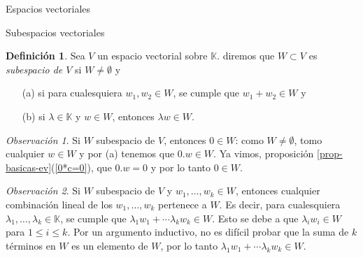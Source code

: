 \documentclass[a4paper,12pt,twoside,spanish]{amsbook}
\theoremstyle{definition}
\newtheorem{definicion}{Definici\'on}[section]
\theoremstyle{remark}
\newtheorem{observacion}{Observaci\'on}[section]
\newcommand{\K}{\mathbb K}
\begin{document}
\begin{chapter}{Espacios vectoriales}
\begin{section}{Subespacios vectoriales}
	\begin{definicion}
		Sea $V$ un espacio vectorial sobre $\K$. diremos que $W \subset V$ es \textit{subespacio de $V$} si $W \not= \emptyset$ y
		\begin{enumerate}
			\item[(a)] si para cualesquiera $w_1,w_2 \in W$, se cumple que $w_1+w_2 \in W$ y
			\item[(b)] si $\lambda \in \K$ y  $w \in W$, entonces $\lambda w \in W$.
		\end{enumerate}
	\end{definicion}

	\begin{observacion} Si $W$ subespacio de $V$,  entonces $0 \in W$: como  $W \ne \emptyset$, tomo  cualquier $w \in W$ y  por (a) tenemos que $0.w \in W$. Ya vimos, proposición \ref{prop-basicas-ev}(\ref{0*c=0}),  que $0.w =0$ y por lo tanto $0 \in W$. 
	\end{observacion}

	\begin{observacion}
		 Si $W$ subespacio de $V$ y $w_1,\ldots,w_k \in W$,  entonces cualquier combinación lineal de los $w_1,\ldots,w_k$ pertenece a $W$. Es decir, para cualesquiera $\lambda_1,\ldots,\lambda_k \in \K$, se cumple que  $\lambda_1w_1+\cdots\lambda_kw_k \in W$. Esto se debe a que $\lambda_iw_i \in W$ para $1\le i \le k$. Por un argumento inductivo, no es difícil probar que la suma de $k$ términos en $W$ es un elemento de $W$, por lo tanto $\lambda_1w_1+\cdots\lambda_kw_k \in W$.  
	\end{observacion}


\end{section}
\end{chapter}
\end{document}
